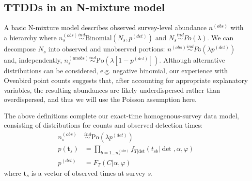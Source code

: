 \documentclass[12pt]{article}
\newcommand{\Po}{\mbox{Po}}
\newcommand{\pdet}{p^{(det)}}
\newcommand{\ind}{\stackrel{ind}{\sim}}
\newcommand{\dt}{\text{det}}
\newcommand{\nobs}{n^{(obs)}}
\begin{document}
\subsection{TTDDs in an N-mixture model}

A basic N-mixture model describes observed survey-level abundance $\nobs$ with a hierarchy where $\nobs_s \ind \mbox{Binomial}\left(N_{s}, \pdet\right)$ and $N_s \ind Po(\lambda)$.
We can decompose $N_{s}$ into observed and unobserved portions: $\nobs \ind Po(\lambda \pdet)$ and, independently, $n_{s}^{(unobs)} \ind \Po\left(\lambda[1-\pdet]\right)$.
Although alternative distributions can be considered, e.g. negative binomial, our experience with Ovenbird point counts suggests that, after accounting for appropriate explanatory variables, the resulting abundances are likely underdispersed rather than overdispersed, and thus we will use the Poisson assumption here. 

The above definitions complete our exact-time homogenous-survey data model, consisting of distributions for counts and observed detection times:
\begin{align}
\nobs_s &\ind \Po(\lambda \pdet) \nonumber\\
p(\textbf{t}_s) &= \prod\limits_{b=1 \dotso\nobs_s} f_{T|\dt}(t_{sb} | \det, \alpha, \varphi) \label{eq:simplemodel}\\
\pdet &= F_T(C|\alpha,\varphi) \nonumber
\end{align}
where $\textbf{t}_s$ is a vector of observed times at survey $s$.
 
\end{document}
